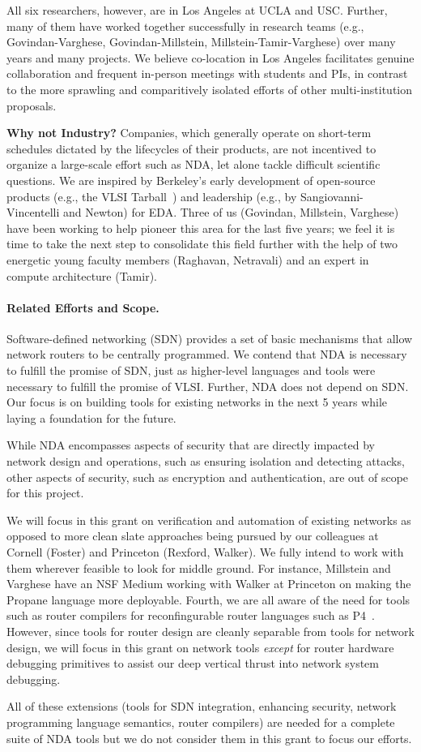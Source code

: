 All six researchers, however, are in Los Angeles at UCLA and USC. Further, many of them have worked together successfully in research teams (e.g., Govindan-Varghese, Govindan-Millstein, Millstein-Tamir-Varghese) over many years and many projects. We believe co-location in Los Angeles facilitates genuine collaboration and frequent in-person meetings with students and PIs, in contrast to the more sprawling and comparitively isolated efforts of other multi-institution proposals.

{\bf Why not Industry?} Companies, which generally operate on short-term schedules dictated by the lifecycles of their products, are not incentived to organize a large-scale effort such as NDA, let alone tackle difficult scientific questions. We are inspired by Berkeley's early development of open-source products (e.g., the VLSI Tarball~\cite{wikicite}) and leadership (e.g., by Sangiovanni-Vincentelli and Newton) for EDA.  Three of us (Govindan, Millstein, Varghese) have been working to help pioneer this area for the last five years; we feel it is time to take the next step to consolidate this field further with the help of two energetic young faculty members (Raghavan, Netravali) and an expert in compute architecture (Tamir).

\paragraph*{Related Efforts and Scope.}
%
Software-defined networking (SDN) provides a set of basic mechanisms that allow network routers to be centrally programmed.  We contend that NDA is necessary to fulfill the promise of SDN, just as higher-level languages and tools were necessary to fulfill the promise of VLSI. Further, NDA does not depend on SDN. Our focus is on building tools for existing networks in the next 5 years while laying a foundation for the future.

While NDA encompasses aspects of security that are directly impacted by network design and operations, such as ensuring isolation and detecting attacks, other aspects of security, such as encryption and authentication, are out of scope for this project.

We will focus in this grant on verification and automation of
existing networks as opposed to more clean slate
approaches being pursued by our colleagues at Cornell (Foster) and Princeton (Rexford, Walker).  We fully intend to work with them wherever feasible to look for middle ground. For instance, Millstein and Varghese have an NSF Medium working with Walker at Princeton on making the Propane language more deployable. Fourth, we are all aware of the need for tools such as router compilers for reconfingurable router languages such as P4~\cite{P4}. However, since tools for router design are cleanly separable from tools for network design, we will focus in this grant on
network tools {\em except} for router hardware debugging primitives to
assist our deep vertical thrust into network system debugging.

All of these extensions (tools for SDN integration, enhancing security, network
programming language semantics, router compilers) are needed for a complete suite of NDA tools but we do not consider them in this grant to focus our efforts.
